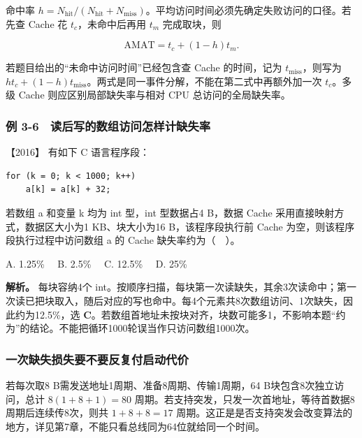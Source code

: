 命中率 \(h=N_{\mathrm{hit}}/(N_{\mathrm{hit}}+N_{\mathrm{miss}})\)。平均访问时间必须先确定失败访问的口径。若先查 Cache 花 \(t_c\)，未命中后再用 \(t_m\) 完成取块，则

\[
\mathrm{AMAT}=t_c+(1-h)t_m.
\]

若题目给出的``未命中访问时间''已经包含查 Cache 的时间，记为 \(t_{\mathrm{miss}}\)，则写为 \(ht_c+(1-h)t_{\mathrm{miss}}\)。两式是同一事件分解，不能在第二式中再额外加一次 \(t_c\)。多级 Cache 则应区别局部缺失率与相对 CPU 总访问的全局缺失率。

\subsubsection{例 3-6　读后写的数组访问怎样计缺失率}\label{co-ex3-6}

\noindent{}【2016】 有如下 C 语言程序段：

\par\medskip\noindent
\begin{minipage}{\linewidth}
\begin{verbatim}
for (k = 0; k < 1000; k++)
    a[k] = a[k] + 32;
\end{verbatim}
\end{minipage}\par\medskip

若数组 a 和变量 k 均为 int 型，int 型数据占4 B，数据 Cache 采用直接映射方式，数据区大小为1 KB、块大小为16 B，该程序段执行前 Cache 为空，则该程序段执行过程中访问数组 a 的 Cache 缺失率约为（　）。

A. 1.25\%　 B. 2.5\%　 C. 12.5\%　 D. 25\%


\textbf{解析。} 每块容纳4个 int。按顺序扫描，每块第一次读缺失，其余3次读命中；第一次读已把块取入，随后对应的写也命中。每4个元素共8次数组访问、1次缺失，因此约为12.5\%，选 \textbf{C}。若数组首地址未按块对齐，块数可能多1，不影响本题``约为''的结论。不能把循环1000轮误当作只访问数组1000次。

\subsubsection{一次缺失损失要不要反复付启动代价}\label{ux4e00ux6b21ux7f3aux5931ux635fux5931ux8981ux4e0dux8981ux53cdux590dux4ed8ux542fux52a8ux4ee3ux4ef7}

若每次取8 B需发送地址1周期、准备8周期、传输1周期，64 B块包含8次独立访问，总计 \(8(1+8+1)=80\) 周期。若支持突发，只发一次首地址，等待首数据8周期后连续传8次，则共 \(1+8+8=17\) 周期。这正是是否支持突发会改变算法的地方，详见第7章，不能只看总线同为64位就给同一个时间。

